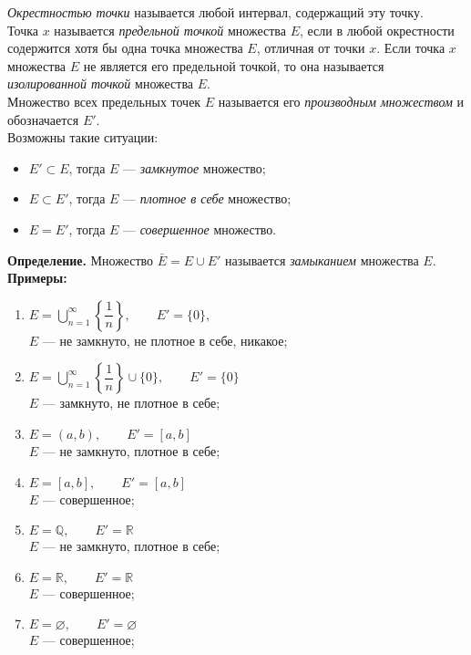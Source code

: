 \documentclass[12pt,a4paper, titlepage]{article}
\begin{document}
\textit{Окрестностью точки} называется любой интервал, содержащий эту точку.\\

Точка $x$ называется \textit{предельной точкой} множества $E$, если в любой окрестности содержится хотя бы одна точка множества $E$, отличная от точки $x$.
Если точка $x$ множества $E$ не является его предельной точкой, то она называется \textit{изолированной точкой} множества $E$.\\

Множество всех предельных точек $E$ называется его \textit{производным множеством} и обозначается $E'$.\\

Возможны такие ситуации:
\begin{itemize}
\item $E' \subset E$, тогда $E$ --- \textit{замкнутое} множество;
\item $E \subset E'$, тогда $E$ --- \textit{плотное в себе} множество;
\item $E = E'$, тогда $E$ --- \textit{совершенное} множество.
\end{itemize}

\textbf{Определение.} Множество $\bar E = E \cup E'$ называется \textit{замыканием} множества $E$.\\

\textbf{Примеры:} \medskip
\begin{enumerate}
\item  $ E = \bigcup \limits_{n=1}^{\infty}{\left\lbrace \dfrac 1 n \right\rbrace},\qquad E' = \{ 0 \},$ \smallskip\\
$E$ --- не замкнуто, не плотное в себе, никакое;
\medskip
\item $E = \bigcup \limits_{n=1}^{\infty}{\left\lbrace \dfrac 1 n \right\rbrace} \cup \{ 0 \},\qquad E'= \{ 0 \}$ \smallskip\\
		$E$ --- замкнуто, не плотное в себе;
\medskip
\item $E = (a, b),\qquad E' = [a, b]$ \smallskip\\
		$E$ --- не замкнуто, плотное в себе;
\medskip
\item $E = [a, b],\qquad E' = [a, b]$ \smallskip\\
		$E$ --- совершенное;
\medskip
\item $E = \mathbb{Q},\qquad E' = \mathbb{R}$ \smallskip\\
		$E$ --- не замкнуто, плотное в себе;
\medskip
\item $E = \mathbb{R},\qquad E' = \mathbb{R}$ \smallskip\\
		$E$ --- совершенное;
\medskip
\item $E = \varnothing,\qquad E' = \varnothing$ \smallskip\\
		$E$ --- совершенное;
\end{enumerate}
\end{document}
